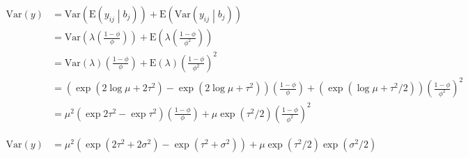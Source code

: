 \documentclass{article}
\begin{document}
\begin{align*}
\text{Var}\left(y\right) & = \text{Var}\left(\text{E}\left(y_{ij} \middle| b_j\right)\right) +
  \text{E}\left(\text{Var}\left(y_{ij} \middle| b_j\right)\right) \\
& = \text{Var}\left(\lambda\left(\frac{1-\phi}{\phi}\right)\right) +
  \text{E}\left(\lambda\left(\frac{1-\phi}{\phi^2}\right)\right) \\
& = \text{Var}\left(\lambda\right)\left(\frac{1-\phi}{\phi}\right) +
  \text{E}\left(\lambda\right)  \left(\frac{1-\phi}{\phi^2}\right)^2 \\
& = \left(\exp{\left(2 \log{\mu} + 2\tau^2 \right)} - \exp{\left(2\log{\mu} + \tau^2 \right)}\right)\left(\frac{1-\phi}{\phi}\right) +
    \left(\exp{\left(\log{\mu}+\tau^2 / 2\right)}\right)\left(\frac{1-\phi}{\phi^2}\right)^2 \\
& = \mu^2 \left(\exp{2\tau^2}-\exp{\tau^2}\right)\left(\frac{1-\phi}{\phi}\right) +
  \mu \exp{\left(\tau^2 / 2\right)}  \left(\frac{1-\phi}{\phi^2}\right)^2
\end{align*}

\begin{align*}
\text{Var}\left(y\right) & =
 \mu^2 \left(\exp\left(2\tau^2 + 2\sigma^2\right) - \exp{\left(\tau^2 + \sigma^2\right)} \right) +
  \mu \exp\left(\tau^2 / 2\right) \exp\left(\sigma^2 / 2\right)
\end{align*}
\end{document}
